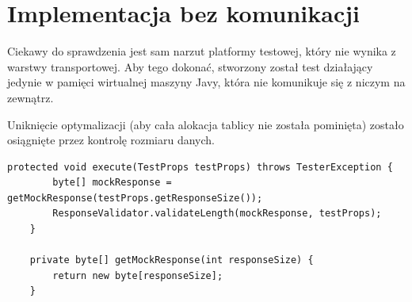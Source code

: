 \section{Implementacja bez komunikacji}

Ciekawy do sprawdzenia jest sam narzut platformy testowej, który nie wynika z warstwy transportowej. Aby tego dokonać, stworzony został test działający jedynie w pamięci wirtualnej maszyny Javy, która nie komunikuje się z niczym na zewnątrz.

Uniknięcie optymalizacji (aby cała alokacja tablicy nie została pominięta) zostało osiągnięte przez kontrolę rozmiaru danych.

\begin{lstlisting}[caption={Test sprawdzający narzut samej platformy.},captionpos=b]
    protected void execute(TestProps testProps) throws TesterException {
        byte[] mockResponse = getMockResponse(testProps.getResponseSize());
        ResponseValidator.validateLength(mockResponse, testProps);
    }

    private byte[] getMockResponse(int responseSize) {
        return new byte[responseSize];
    }
\end{lstlisting}
